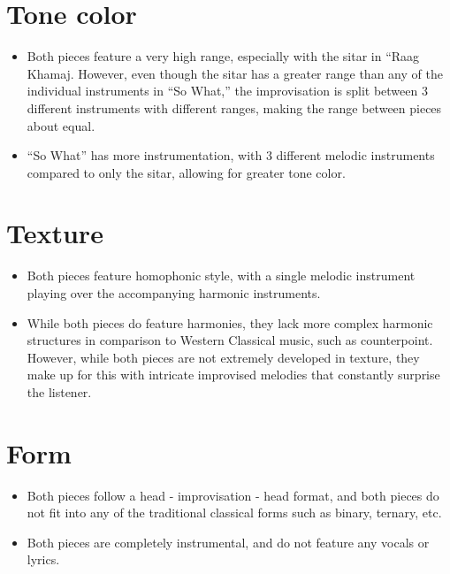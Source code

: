 \documentclass[12pt]{article}
\begin{document}
\section*{Tone color}
\begin{itemize}
\item Both pieces feature a very high range, especially with the sitar in ``Raag
  Khamaj. However, even though the sitar has a greater range than any of the
  individual instruments in ``So What,'' the improvisation is split between 3
  different instruments with different ranges, making the range between pieces
  about equal.
\item ``So What'' has more instrumentation, with 3 different melodic instruments
  compared to only the sitar, allowing for greater tone color.
\end{itemize}
\section*{Texture}
\begin{itemize}
\item Both pieces feature homophonic style, with a single melodic instrument
  playing over the accompanying harmonic instruments.
\item While both pieces do feature harmonies, they lack more complex harmonic
  structures in comparison to Western Classical music, such as counterpoint.
  However, while both pieces are not extremely developed in texture, they make
  up for this with intricate improvised melodies that constantly surprise the
  listener.
\end{itemize}
\section*{Form}
\begin{itemize}
\item Both pieces follow a head - improvisation - head format, and both pieces
  do not fit into any of the traditional classical forms such as binary,
  ternary, etc.
\item Both pieces are completely instrumental, and do not feature any vocals or
  lyrics.
\end{itemize}
\end{document}
